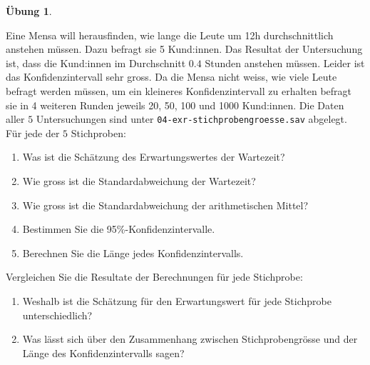 \documentclass[
]{book}
\providecommand{\tightlist}{%
  \setlength{\itemsep}{0pt}\setlength{\parskip}{0pt}}
\theoremstyle{definition}
\theoremstyle{definition}
\theoremstyle{definition}
\newtheorem{exercise}{Übung}[chapter]
\theoremstyle{definition}
\theoremstyle{remark}
\begin{document}
\begin{exercise}
\protect\hypertarget{exr:ki-mean-n-vary}{}\label{exr:ki-mean-n-vary}\leavevmode

Eine Mensa will herausfinden, wie lange die Leute um 12h durchschnittlich anstehen müssen. Dazu befragt sie 5 Kund:innen. Das Resultat der Untersuchung ist, dass die Kund:innen im Durchschnitt \(0.4\) Stunden anstehen müssen. Leider ist das Konfidenzintervall sehr gross. Da die Mensa nicht weiss, wie viele Leute befragt werden müssen, um ein kleineres Konfidenzintervall zu erhalten befragt sie in 4 weiteren Runden jeweils 20, 50, 100 und 1000 Kund:innen. Die Daten aller \(5\) Untersuchungen sind unter \texttt{04-exr-stichprobengroesse.sav} abgelegt. Für jede der \(5\) Stichproben:

\begin{enumerate}
\def\labelenumi{\alph{enumi}.}
\tightlist
\item
  Was ist die Schätzung des Erwartungswertes der Wartezeit?
\item
  Wie gross ist die Standardabweichung der Wartezeit?
\item
  Wie gross ist die Standardabweichung der arithmetischen Mittel?
\item
  Bestimmen Sie die 95\%-Konfidenzintervalle.
\item
  Berechnen Sie die Länge jedes Konfidenzintervalls.
\end{enumerate}

Vergleichen Sie die Resultate der Berechnungen für jede Stichprobe:

\begin{enumerate}
\def\labelenumi{\alph{enumi}.}
\setcounter{enumi}{5}
\tightlist
\item
  Weshalb ist die Schätzung für den Erwartungswert für jede Stichprobe unterschiedlich?
\item
  Was lässt sich über den Zusammenhang zwischen Stichprobengrösse und der Länge des Konfidenzintervalls sagen?
\end{enumerate}

\end{exercise}
\end{document}
